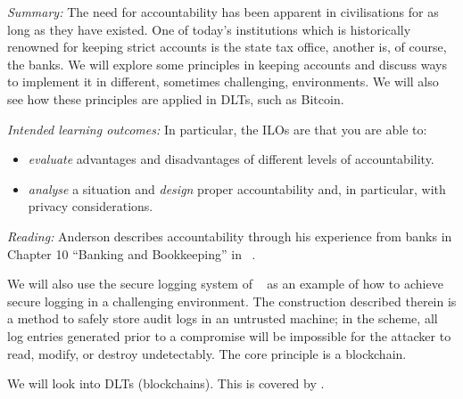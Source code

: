 \emph{Summary:}
The need for accountability has been apparent in civilisations for as long as 
they have existed.
One of today's institutions which is historically renowned for keeping strict 
accounts is the state tax office, another is, of course, the banks.
We will explore some principles in keeping accounts and discuss ways to 
implement it in different, sometimes challenging, environments.
We will also see how these principles are applied in \acp{DLT}, such as 
Bitcoin.

\emph{Intended learning outcomes:}
In particular, the \acp{ILO} are that you are able to:
\begin{itemize}
  \item \emph{evaluate} advantages and disadvantages of different levels of 
    accountability.
  \item \emph{analyse} a situation and \emph{design} proper accountability and,
    in particular, with privacy considerations.
\end{itemize}

\emph{Reading:}
Anderson describes accountability through his experience from banks in Chapter 
10 \enquote{Banking and Bookkeeping} in 
~\cite{Anderson2008sea}.

We will also use the secure logging system of 
\citeauthor{schneier1999secure}~\cite{schneier1999secure} as an example of how 
to achieve secure logging in a challenging environment.
The construction described therein is a method to safely store audit logs in an 
untrusted machine; in the scheme, all log entries generated prior to 
a compromise will be impossible for the attacker to read, modify, or destroy 
undetectably.
The core principle is a blockchain.

We will look into \acp{DLT} (blockchains).
This is covered by \textcite[Sect.~3, 4]{NISTblockchainOverview}.
